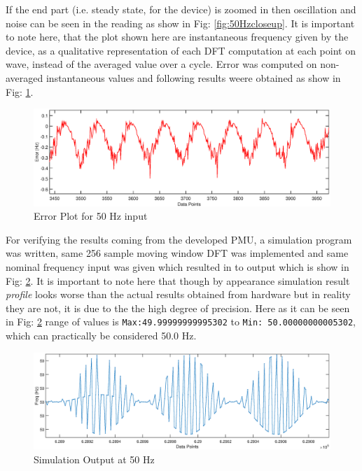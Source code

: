 If the end part (i.e. steady state, for the device) is zoomed in then oscillation and noise can be seen in the reading as show in Fig: \ref{fig:50Hzcloseup}. It is important to note here, that the plot shown here are instantaneous frequency given by the device, as a qualitative representation of each DFT computation at each point on wave, instead of the averaged value over a cycle. Error was computed on non-averaged instantaneous values and following results weere obtained as show in Fig: \ref{fig:50Hz error}.

\begin{figure}[h]
	\includegraphics[width=\textwidth]{fig/50Hz_freq_error_closeup.eps}
	\caption{Error Plot for 50 Hz input}
	\label{fig:50Hz error}
\end{figure}
For verifying the results coming from the developed PMU, a simulation program was written, same 256 sample moving window DFT was implemented and same nominal frequency input was given which resulted in to output which is show in Fig: \ref{fig:50Hz simulation}. It is important to note here that though by appearance simulation result \emph{profile} looks worse than the actual results obtained from hardware but in reality they are not, it is due to the the high degree of precision. Here as it can be seen in Fig: \ref{fig:50Hz simulation} range of values is  \texttt{Max:49.99999999995302} to \texttt{Min: 50.00000000005302}, which can practically be considered 50.0 Hz. 
\begin{figure}[h]
	\includegraphics[width=\textwidth]{fig/50Hz_simulated.eps}
	\caption{Simulation Output at 50 Hz}
	\label{fig:50Hz simulation}
\end{figure}
   
